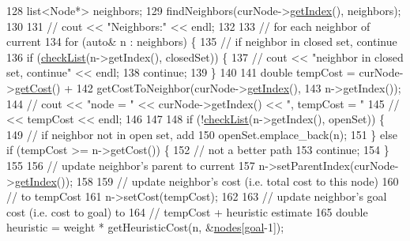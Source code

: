 \begin{DoxyCode}
128 \textcolor{preprocessor}{}        list<Node*> neighbors;
129         findNeighbors(curNode->\hyperlink{classNode_af157df6ef5c45d7ce978e9c7371c297e}{getIndex}(), neighbors);
130 
131         \textcolor{comment}{// cout << "Neighbors:" << endl;}
132 
133         \textcolor{comment}{// for each neighbor of current}
134         \textcolor{keywordflow}{for} (\textcolor{keyword}{auto}& n : neighbors) \{
135             \textcolor{comment}{// if neighbor in closed set, continue}
136             \textcolor{keywordflow}{if} (\hyperlink{AStarAlgorithm_8cpp_a79d7a8f837b09f62b8595c351f24f367}{checkList}(n->getIndex(), closedSet)) \{
137                 \textcolor{comment}{// cout << "neighbor in closed set, continue" << endl;}
138                 \textcolor{keywordflow}{continue};
139             \}
140 
141             \textcolor{keywordtype}{double} tempCost = curNode->\hyperlink{classNode_a06d6bc069a40309fb4d228af02dface4}{getCost}() +
142                               getCostToNeighbor(curNode->\hyperlink{classNode_af157df6ef5c45d7ce978e9c7371c297e}{getIndex}(),
143                                                 n->getIndex());
144             \textcolor{comment}{// cout << "node = " << curNode->getIndex() << ", tempCost = "}
145             \textcolor{comment}{//     << tempCost << endl;}
146 
147 
148             \textcolor{keywordflow}{if} (!\hyperlink{AStarAlgorithm_8cpp_a79d7a8f837b09f62b8595c351f24f367}{checkList}(n->getIndex(), openSet)) \{
149                 \textcolor{comment}{// if neighbor not in open set, add}
150                 openSet.emplace\_back(n);
151             \} \textcolor{keywordflow}{else} \textcolor{keywordflow}{if} (tempCost >= n->getCost()) \{
152                 \textcolor{comment}{// not a better path}
153                 \textcolor{keywordflow}{continue};
154             \}
155 
156             \textcolor{comment}{// update neighbor's parent to current}
157             n->setParentIndex(curNode->\hyperlink{classNode_af157df6ef5c45d7ce978e9c7371c297e}{getIndex}());
158 
159             \textcolor{comment}{// update neighbor's cost (i.e. total cost to this node)}
160             \textcolor{comment}{// to tempCost}
161             n->setCost(tempCost);
162 
163             \textcolor{comment}{// update neighbor's goal cost (i.e. cost to goal) to}
164             \textcolor{comment}{// tempCost + heuristic estimate}
165             \textcolor{keywordtype}{double} heuristic = weight * getHeuristicCost(n, &\hyperlink{classPathFindingAlgorithm_a3405321350d5fb10ba367c47944a7b77}{nodes}[\hyperlink{classPathFindingAlgorithm_ae8acf41f92ba72a969a44640c99fb8a4}{goal}-1]);

\end{DoxyCode}
